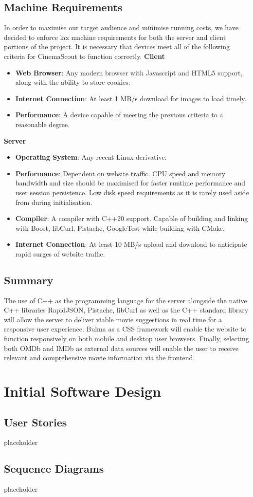 \documentclass{article}
\begin{document}
\subsection{Machine Requirements}
In order to maximise our target audience and minimise running costs, we have 
decided to enforce lax machine requirements for both the server and client
portions of the project. It is necessary that devices meet all of the following
criteria for CinemaScout to function correctly.\newline\newline
\textbf{Client}
\begin{itemize}
\item \textbf{Web Browser}: Any modern browser with Javascript and HTML5
support, along with the ability to store cookies.
\item \textbf{Internet Connection}: At least 1 MB/s download for images to load 
timely.
\item \textbf{Performance}: A device capable of meeting the previous criteria
to a reasonable degree.
\end{itemize}
\textbf{Server}
\begin{itemize}
\item \textbf{Operating System}: Any recent Linux derivative.
\item \textbf{Performance}: Dependent on website traffic. CPU speed and memory
bandwidth and size should be maximised for faster runtime performance and user
session persistence. Low disk speed requirements as it is rarely used aside
from during initialisation.
\item \textbf{Compiler}: A compiler with C++20 support. Capable of building and
linking with Boost, libCurl, Pistache, GoogleTest while building with CMake.
\item \textbf{Internet Connection}: At least 10 MB/s upload and download to 
anticipate rapid surges of website traffic.
\end{itemize}
\subsection{Summary}
The use of C++ as the programming language for the server alongside the native
C++ libraries  RapidJSON, Pistache, libCurl as well as the C++ standard library
will allow the server to deliver viable movie suggestions in real time for a
responsive user experience. Bulma as a CSS framework will enable the website to
function responsively on both mobile and desktop user browsers. Finally,
selecting both OMDb and IMDb as external data sources will enable the user
to receive relevant and comprehensive movie information via the frontend.
\section{Initial Software Design}
\subsection{User Stories}
placeholder
\subsection{Sequence Diagrams}
placeholder
\end{document}
